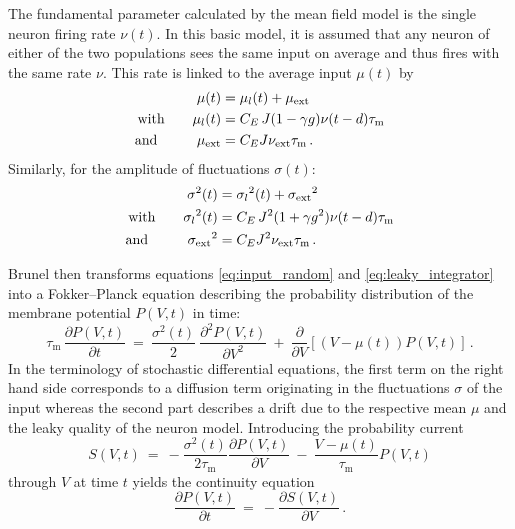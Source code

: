 The fundamental parameter calculated by the mean field model is the single neuron
firing rate $\nu(t)$. In this basic model, it is assumed that any neuron of either 
of the two populations sees the same input on average and thus fires with the same 
rate $\nu$. This rate is linked to the average input $\mu(t)$ by
\begin{equation}
    \begin{split}
        \mu(t)          &= \mu_l(t) + \mu_\text{ext} \\
        \text{with} \qquad \mu_l(t)        &= C_E \, J (1 - \gamma g) \nu(t - d) \tau_\text{m} \\
        \text{and~~\,} \qquad \mu_\text{ext}  &= C_E J \nu_\text{ext} \tau_\text{m} \,.
        \label{eq:mu}
    \end{split}
\end{equation}
Similarly, for the amplitude of fluctuations $\sigma(t)$:
\begin{equation}
    \begin{split}
        \sigma^2(t)     &= {\sigma_l}^2(t) + {\sigma_\text{ext}}^2 \\
        \text{with} \qquad      {\sigma_l}^2(t)       
                        &= C_E \, J^2 (1 + \gamma g^2) \nu(t - d) \tau_\text{m} \\
            \text{and~~\,}  \qquad    
        {\sigma_\text{ext}}^2  &= C_E J^2 \nu_\text{ext} \tau_\text{m} \,.
        \label{eq:sigma}
    \end{split}
\end{equation}



Brunel then transforms equations \eqref{eq:input_random} and \eqref{eq:leaky_integrator}
into a Fokker--Planck equation describing the probability distribution of the membrane 
potential $P(V, t)$ in time: 
\begin{equation}
    \tau_\text{m} \, \frac{\partial P(V, t)}{\partial t} 
       \: = \: \frac{\sigma^2(t)}{2}  \: \frac{\partial^2 P(V, t)}{\partial V^2} 
         \: + \: \frac{\partial }{\partial V}  [(V- \mu(t)) P(V, t)] \, .
    \label{eq:fokker_planck}
\end{equation}
In the terminology of stochastic differential equations, the first term on the 
right hand side corresponds to a diffusion term originating in the fluctuations $\sigma$ 
of the input whereas the second part describes a drift due to the respective mean $\mu$ 
and the leaky quality of the neuron model. Introducing the probability current 
\begin{equation}
    S(V, t) 
    \: = \: - \frac{\sigma^2(t)}{2 \tau_\text{m}} \frac{\partial P(V, t)}{\partial V}  
        \: - \: \frac{V - \mu(t)}{\tau_\text{m}} P(V, t)
    \label{eq:prob_curr}
\end{equation}
through $V$ at time $t$ yields the continuity equation 
\begin{equation}
    \frac{\partial P(V, t)}{\partial t} \:=\: - \frac{\partial S(V, t)}{\partial V} \,.
    \label{eq:continuity}
\end{equation}

